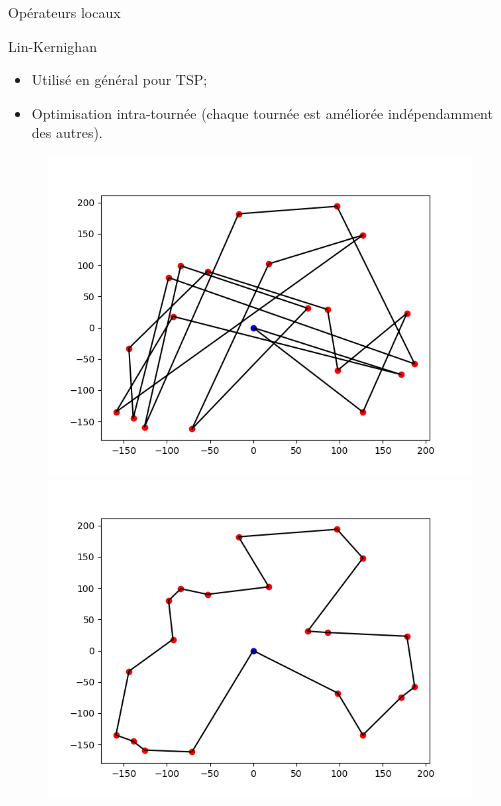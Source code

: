 \documentclass{beamer}
\begin{document}
\begin{frame}{Opérateurs locaux}
\begin{block}{Lin-Kernighan}
\begin{itemize}
\item Utilisé en général pour TSP;
\item Optimisation intra-tournée (chaque tournée est améliorée indépendamment des autres).
\end{itemize}
\end{block}
\begin{figure}
	\centering
	\includegraphics[scale=0.3]{test4_20_init.png}
	\includegraphics[scale=0.3]{test4_20_LKopt.png}
\end{figure} 
\end{frame}
\end{document}
